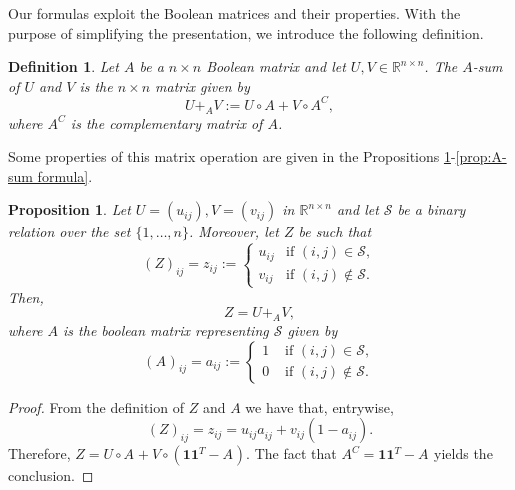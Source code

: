 \documentclass[a4paper,12pt]{article}
\newtheorem{definition}{Definition}
\newtheorem{proposition}{Proposition}
\newcommand{\R}{\mathbb{R}}
\newcommand{\cS}{\mathcal{S}}
\newcommand{\onevec}{\mathbf{1}}
\begin{document}
Our formulas exploit the Boolean matrices and their properties. With the purpose of simplifying the presentation, we introduce the following definition. 

\begin{definition}\label{def:Asum}
    Let $A$ be a $n \times n$ Boolean matrix and let $U,V\in \R ^{n \times n}$. The \emph{$A$-sum} of $U$ and $V$ is the $n \times n$ matrix given by
    \begin{equation*} \label{eq:A-sum}
     U +_A V := U \circ A + V \circ A^{C},   
    \end{equation*}
    where $A^{C}$ is the complementary matrix of $A$.
\end{definition}


Some properties of this matrix operation are given in the Propositions \ref{prop:build_Z_with_A_sum}-\ref{prop:A-sum formula}. 

\begin{proposition} \label{prop:build_Z_with_A_sum}
Let $U=(u_{ij}),V=(v_{ij})$ in $\R^{n \times n}$ and let $\cS$ be a binary relation over the set $\{1,\dots,n\}$. Moreover, let $Z$ be such that 
\begin{equation*}
    (Z)_{ij} =z_{ij} :=
    \begin{cases}
        u_{ij} & \text{if } (i,j)\in\cS,  \\
        v_{ij} & \text{if } (i,j)\notin\cS.
    \end{cases}
\end{equation*}
Then, 
\begin{equation*}
    Z  = U +_{A^{}}V,
\end{equation*}    
where $A$ is the boolean matrix representing ${\cS}$ given by
\begin{equation*}
(A^{})_{ij}= a_{ij}:=
    \begin{cases}
        1 & \text{ if } (i,j)\in \cS, \\
        0 & \text{ if } (i,j)\notin \cS.
    \end{cases}
\end{equation*}
\end{proposition}
\begin{proof}
From the definition of $Z$ and $A$ we have that, entrywise,
\begin{equation*}
    (Z)_{ij}=z_{ij} = u_{ij}a^{}_{ij} + v_{ij}(1- a^{}_{ij}).
\end{equation*}
Therefore, $Z= U\circ A^{} + V \circ (\onevec\onevec^T - A^{})$. The fact that $A^C=\onevec\onevec^T - A^{}$ yields the conclusion.
\end{proof}
\end{document}

